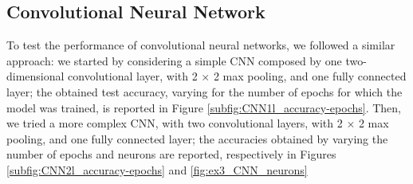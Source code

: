 \documentclass[12pt]{article}
\begin{document}
\subsection{Convolutional Neural Network}
To test the performance of convolutional neural networks, we followed a similar approach: we started by considering a simple CNN composed by one two-dimensional convolutional layer, with 2 $\times$ 2 max pooling, and one fully connected layer; the obtained test accuracy, varying for the number of epochs for which the model was trained, is reported in Figure \ref{subfig:CNN1l_accuracy-epochs}.\newline
Then, we tried a more complex CNN, with two convolutional layers, with 2 $\times$ 2 max pooling, and one fully connected layer; the accuracies obtained by varying the number of epochs and neurons are reported, respectively in Figures \ref{subfig:CNN2l_accuracy-epochs} and \ref{fig:ex3_CNN_neurons}
\end{document}
